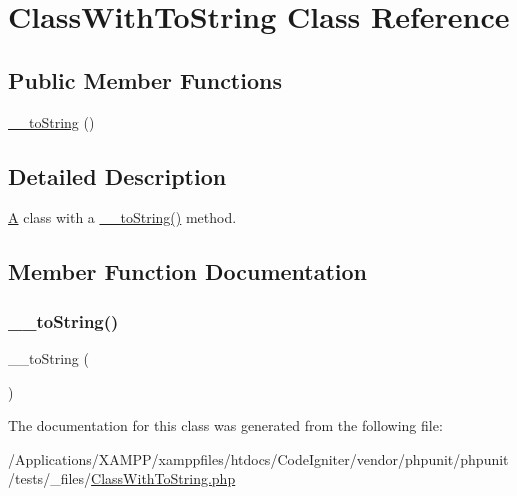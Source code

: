 \hypertarget{class_class_with_to_string}{}\section{Class\+With\+To\+String Class Reference}
\label{class_class_with_to_string}
\subsection*{Public Member Functions}
\begin{DoxyCompactItemize}
\item 
\mbox{\hyperlink{class_class_with_to_string_a7516ca30af0db3cdbf9a7739b48ce91d}{\+\_\+\+\_\+to\+String}} ()
\end{DoxyCompactItemize}


\subsection{Detailed Description}
\mbox{\hyperlink{class_a}{A}} class with a \mbox{\hyperlink{class_class_with_to_string_a7516ca30af0db3cdbf9a7739b48ce91d}{\+\_\+\+\_\+to\+String()}} method. 

\subsection{Member Function Documentation}
\mbox{\label{class_class_with_to_string_a7516ca30af0db3cdbf9a7739b48ce91d}} 
\subsubsection{\texorpdfstring{\+\_\+\+\_\+to\+String()}{\_\_toString()}}
{\footnotesize\ttfamily \+\_\+\+\_\+to\+String (\begin{DoxyParamCaption}{ }\end{DoxyParamCaption})}



The documentation for this class was generated from the following file\+:\begin{DoxyCompactItemize}
\item 
/\+Applications/\+X\+A\+M\+P\+P/xamppfiles/htdocs/\+Code\+Igniter/vendor/phpunit/phpunit/tests/\+\_\+files/\mbox{\hyperlink{phpunit_2phpunit_2tests_2__files_2_class_with_to_string_8php}{Class\+With\+To\+String.\+php}}\end{DoxyCompactItemize}
